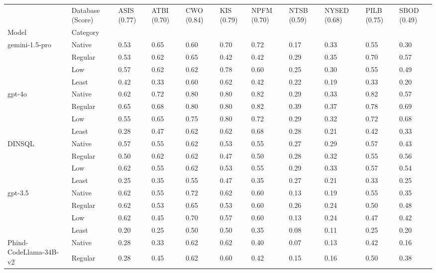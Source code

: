 \begin{tabular}{p{.9in}p{.5in}p{.3in}p{.3in}p{.3in}p{.3in}p{.3in}p{.3in}p{.3in}p{.3in}p{.3in}}
\toprule
 & Database (Score) & ASIS (0.77) & ATBI (0.70) & CWO (0.84) & KIS (0.79) & NPFM (0.70) & NTSB (0.59) & NYSED (0.68) & PILB (0.75) & SBOD (0.49) \\
Model & Category &  &  &  &  &  &  &  &  &  \\
\midrule
\multirow[t]{4}{*}{gemini-1.5-pro} & Native & 0.53 & 0.65 & 0.60 & 0.70 & 0.72 & 0.17 & 0.33 & 0.55 & 0.30 \\
 & Regular & 0.53 & 0.62 & 0.65 & 0.42 & 0.42 & 0.29 & 0.35 & 0.70 & 0.57 \\
 & Low & 0.57 & 0.62 & 0.62 & 0.78 & 0.60 & 0.25 & 0.30 & 0.55 & 0.49 \\
 & Least & 0.42 & 0.33 & 0.60 & 0.62 & 0.42 & 0.22 & 0.19 & 0.33 & 0.20 \\
\cline{1-11}
\multirow[t]{4}{*}{gpt-4o} & Native & 0.62 & 0.72 & 0.80 & 0.80 & 0.82 & 0.29 & 0.33 & 0.82 & 0.57 \\
 & Regular & 0.65 & 0.68 & 0.80 & 0.80 & 0.82 & 0.39 & 0.37 & 0.78 & 0.69 \\
 & Low & 0.55 & 0.65 & 0.75 & 0.80 & 0.72 & 0.29 & 0.32 & 0.72 & 0.68 \\
 & Least & 0.28 & 0.47 & 0.62 & 0.62 & 0.68 & 0.28 & 0.21 & 0.42 & 0.33 \\
\cline{1-11}
\multirow[t]{4}{*}{DINSQL} & Native & 0.57 & 0.55 & 0.62 & 0.53 & 0.55 & 0.27 & 0.29 & 0.57 & 0.43 \\
 & Regular & 0.50 & 0.62 & 0.62 & 0.47 & 0.50 & 0.28 & 0.32 & 0.55 & 0.56 \\
 & Low & 0.62 & 0.55 & 0.62 & 0.53 & 0.55 & 0.29 & 0.33 & 0.57 & 0.54 \\
 & Least & 0.25 & 0.35 & 0.55 & 0.47 & 0.35 & 0.27 & 0.21 & 0.33 & 0.25 \\
\cline{1-11}
\multirow[t]{4}{*}{gpt-3.5} & Native & 0.62 & 0.55 & 0.72 & 0.62 & 0.60 & 0.13 & 0.19 & 0.55 & 0.35 \\
 & Regular & 0.62 & 0.53 & 0.65 & 0.53 & 0.60 & 0.26 & 0.24 & 0.50 & 0.48 \\
 & Low & 0.62 & 0.45 & 0.70 & 0.57 & 0.60 & 0.13 & 0.24 & 0.47 & 0.42 \\
 & Least & 0.20 & 0.25 & 0.50 & 0.50 & 0.35 & 0.08 & 0.11 & 0.25 & 0.20 \\
\cline{1-11}
\multirow[t]{4}{*}{Phind-CodeLlama-34B-v2} & Native & 0.28 & 0.33 & 0.62 & 0.62 & 0.40 & 0.07 & 0.13 & 0.42 & 0.16 \\
 & Regular & 0.28 & 0.45 & 0.62 & 0.60 & 0.42 & 0.15 & 0.16 & 0.50 & 0.38 \\

\end{tabular}
